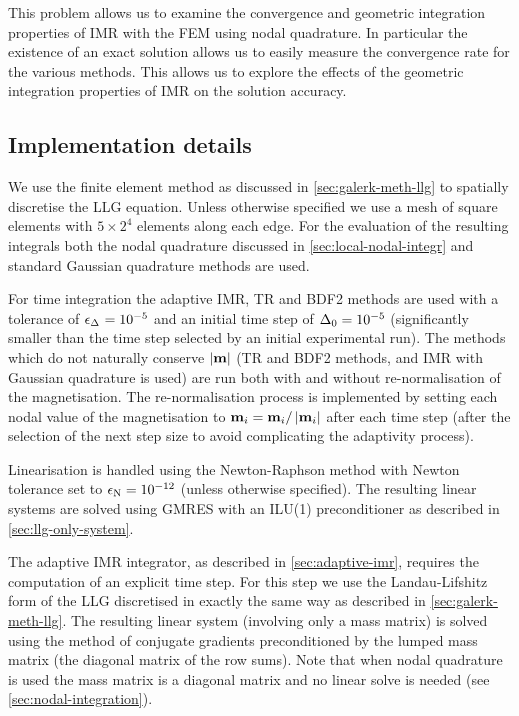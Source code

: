 This problem allows us to examine the convergence and geometric integration properties of IMR with the FEM using nodal quadrature.
In particular the existence of an exact solution allows us to easily measure the convergence rate for the various methods.
This allows us to explore the effects of the geometric integration properties of IMR on the solution accuracy.


\subsection{Implementation details}
\label{sec:impl-deta}

We use the finite element method as discussed in \cref{sec:galerk-meth-llg} to spatially discretise the LLG equation.
Unless otherwise specified we use a mesh of square elements with $5 \times 2^4$ elements along each edge.
For the evaluation of the resulting integrals both the nodal quadrature discussed in \cref{sec:local-nodal-integr} and standard Gaussian quadrature methods are used.

For time integration the adaptive IMR, TR and BDF2 methods are used with a tolerance of $\epsilon_{\Delta_{}} = 10^{-5}$ and an initial time step of $\Delta_{0} = 10^{-5}$ (significantly smaller than the time step selected by an initial experimental run).
The methods which do not naturally conserve $\left|{\boldsymbol{\mathrm{m}}} \right|$ (TR and BDF2 methods, and IMR with Gaussian quadrature is used) are run both with and without re-normalisation of the magnetisation.
The re-normalisation process is implemented by setting each nodal value of the magnetisation to $\boldsymbol{\mathrm{m}}_i = \boldsymbol{\mathrm{m}}_i/\left|{\boldsymbol{\mathrm{m}}_i} \right|$ after each time step (after the selection of the next step size to avoid complicating the adaptivity process).

Linearisation is handled using the Newton-Raphson method with Newton tolerance set to $\epsilon_{\mathrm{N}} = 10^{-12}$ (unless otherwise specified).
The resulting linear systems are solved using GMRES with an ILU(1) preconditioner as described in \cref{sec:llg-only-system}.

The adaptive IMR integrator, as described in \cref{sec:adaptive-imr}, requires the computation of an explicit time step.
For this step we use the Landau-Lifshitz form of the LLG discretised in exactly the same way as described in \cref{sec:galerk-meth-llg}.
The resulting linear system (involving only a mass matrix) is solved using the method of conjugate gradients preconditioned by the lumped mass matrix (\ie the diagonal matrix of the row sums).
Note that when nodal quadrature is used the mass matrix is a diagonal matrix and no linear solve is needed (see \cref{sec:nodal-integration}).


